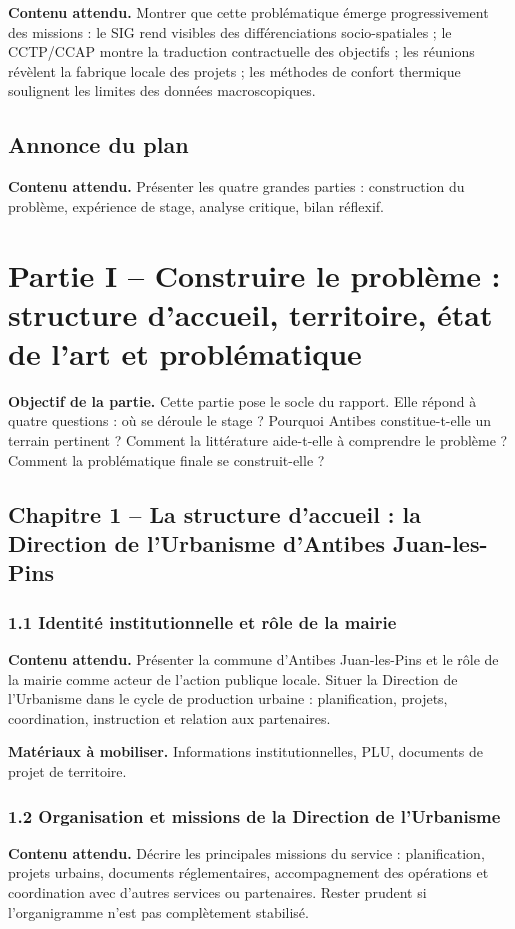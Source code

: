 \documentclass[11pt,a4paper]{article}
\begin{document}
\textbf{Contenu attendu.} Montrer que cette problématique émerge progressivement des missions : le SIG rend visibles des différenciations socio-spatiales ; le CCTP/CCAP montre la traduction contractuelle des objectifs ; les réunions révèlent la fabrique locale des projets ; les méthodes de confort thermique soulignent les limites des données macroscopiques.

\subsection{Annonce du plan}
\textbf{Contenu attendu.} Présenter les quatre grandes parties : construction du problème, expérience de stage, analyse critique, bilan réflexif.

\section{Partie I -- Construire le problème : structure d'accueil, territoire, état de l'art et problématique}

\textbf{Objectif de la partie.} Cette partie pose le socle du rapport. Elle répond à quatre questions : où se déroule le stage ? Pourquoi Antibes constitue-t-elle un terrain pertinent ? Comment la littérature aide-t-elle à comprendre le problème ? Comment la problématique finale se construit-elle ?

\subsection{Chapitre 1 -- La structure d'accueil : la Direction de l'Urbanisme d'Antibes Juan-les-Pins}

\subsubsection{1.1 Identité institutionnelle et rôle de la mairie}
\textbf{Contenu attendu.} Présenter la commune d'Antibes Juan-les-Pins et le rôle de la mairie comme acteur de l'action publique locale. Situer la Direction de l'Urbanisme dans le cycle de production urbaine : planification, projets, coordination, instruction et relation aux partenaires.

\textbf{Matériaux à mobiliser.} Informations institutionnelles, PLU, documents de projet de territoire.

\subsubsection{1.2 Organisation et missions de la Direction de l'Urbanisme}
\textbf{Contenu attendu.} Décrire les principales missions du service : planification, projets urbains, documents réglementaires, accompagnement des opérations et coordination avec d'autres services ou partenaires. Rester prudent si l'organigramme n'est pas complètement stabilisé.
\end{document}

